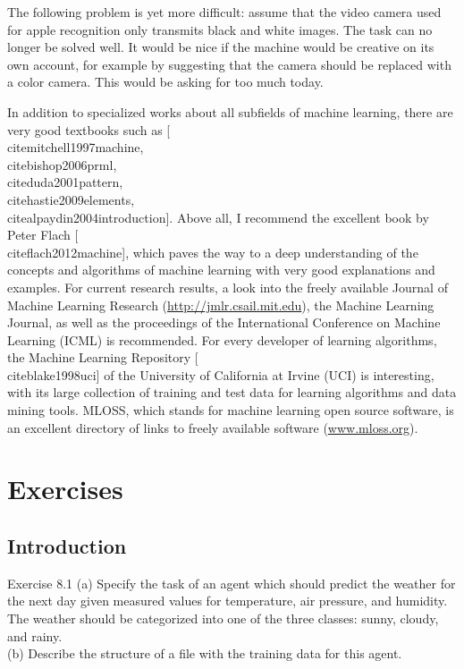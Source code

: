 \documentclass[10pt]{book}
\begin{document}
The following problem is yet more difficult: assume that the video camera used for apple recognition only transmits black and white images. The task can no longer be solved well. It would be nice if the machine would be creative on its own account, for example by suggesting that the camera should be replaced with a color camera. This would be asking for too much today.

In addition to specialized works about all subfields of machine learning, there are very good textbooks such as [\\cite{mitchell1997machine}, \\cite{bishop2006prml}, \\cite{duda2001pattern}, \\cite{hastie2009elements}, \\cite{alpaydin2004introduction}]. Above all, I recommend the excellent book by Peter Flach [\\cite{flach2012machine}], which paves the way to a deep understanding of the concepts and algorithms of machine learning with very good explanations and examples. For current research results, a look into the freely available Journal of Machine Learning Research (\href{http://jmlr.csail.mit.edu}{http://jmlr.csail.mit.edu}), the Machine Learning Journal, as well as the proceedings of the International Conference on Machine Learning (ICML) is recommended. For every developer of learning algorithms, the Machine Learning Repository [\\cite{blake1998uci}] of the University of California at Irvine (UCI) is interesting, with its large collection of training and test data for learning algorithms and data mining tools. MLOSS, which stands for machine learning open source software, is an excellent directory of links to freely available software (\href{http://www.mloss.org}{www.mloss.org}).

\section{Exercises}
\subsection{Introduction}
Exercise 8.1
(a) Specify the task of an agent which should predict the weather for the next day given measured values for temperature, air pressure, and humidity. The weather should be categorized into one of the three classes: sunny, cloudy, and rainy.\\
(b) Describe the structure of a file with the training data for this agent.
\end{document}
